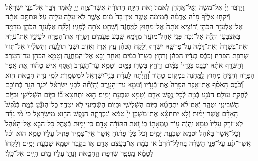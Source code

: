 \documentclass[twoside, openany, parskip=half, 11pt]{book}
\begin{document}
\begin{footnotesize}
\begin{multicols}{2}
\\
וַיְֿדַבֵּ֣ר יְיָ֔ אֶל־מֹשֶׁ֥ה וְֿאֶֽל־אַֽהֲרֹ֖ן לֵאמֹֽר׃ זֹ֚את חֻקַּ֣ת הַתּוֹרָ֔ה אֲשֶׁר־צִוָּ֥ה יְיָ֖ לֵאמֹ֑ר דַּבֵּ֣ר אֶל־בְּֿנֵ֣י יִשְׂרָאֵ֗ל וְֿיִקְח֣וּ אֵלֶ֩יךָ֩ פָרָ֨ה אֲדֻמָּ֜ה תְּֿמִימָ֗ה אֲשֶׁ֤ר אֵין־בָּהּ֙ מ֔וּם אֲשֶׁ֛ר לֹֽא־עָלָ֥ה עָלֶ֖יהָ עֹֽל׃ וּנְתַתֶּ֣ם אֹתָ֔הּ אֶל־אֶלְעָזָ֖ר הַכֹּהֵ֑ן וְֿהוֹצִ֤יא אֹתָהּ֙ אֶל־מִח֣וּץ לַֽמַּֽחֲנֶ֔ה וְֿשָׁחַ֥ט אֹתָ֖הּ לְֿפָנָֽיו׃ וְֿלָקַ֞ח אֶלְעָזָ֧ר הַכֹּהֵ֛ן מִדָּמָ֖הּ בְּֿאֶצְבָּע֑וֹ וְֿהִזָּ֞ה אֶל־נֹ֨כַח פְּֿנֵ֧י אֹֽהֶל־מוֹעֵ֛ד מִדָּמָ֖הּ שֶׁ֥בַע פְּֿעָמִֽים׃ וְֿשָׂרַ֥ף אֶת־הַפָּרָ֖ה לְֿעֵינָ֑יו אֶת־עֹרָ֤הּ וְֿאֶת־בְּֿשָׂרָהּ֙ וְֿאֶת־דָּמָ֔הּ עַל־פִּרְשָׁ֖הּ יִשְׂרֹֽף׃ וְֿלָקַ֣ח הַכֹּהֵ֗ן עֵ֥ץ אֶ֛רֶז וְֿאֵז֖וֹב וּשְׁנִ֣י תוֹלָ֑עַת וְֿהִשְׁלִ֕יךְ אֶל־תּ֖וֹךְ שְֿׂרֵפַ֥ת הַפָּרָֽה׃  וְֿכִבֶּ֨ס בְּֿגָדָ֜יו הַכֹּהֵ֗ן וְֿרָחַ֤ץ בְּֿשָׂרוֹ֙ בַּמַּ֔יִם וְֿאַחַ֖ר יָבֹ֣א אֶל־הַֽמַּֽחֲנֶ֑ה וְֿטָמֵ֥א הַכֹּהֵ֖ן עַד־הָעָֽרֶב׃ וְֿהַשֹּׂרֵ֣ף אֹתָ֔הּ יְֿכַבֵּ֤ס בְּֿגָדָיו֙ בַּמַּ֔יִם וְֿרָחַ֥ץ בְּֿשָׂר֖וֹ בַּמָּ֑יִם וְֿטָמֵ֖א עַד־הָעָֽרֶב׃ וְֿאָסַ֣ף אִ֣ישׁ טָה֗וֹר אֵ֚ת אֵ֣פֶר הַפָּרָ֔ה וְֿהִנִּ֛יחַ מִח֥וּץ לַֽמַּֽחֲנֶ֖ה בְּֿמָק֣וֹם טָה֑וֹר וְֽֿ֠הָֽיְֿתָ֠ה לַֽעֲדַ֨ת בְּֿנֵֽי־יִשְׂרָאֵ֧ל לְֿמִשְׁמֶ֛רֶת לְֿמֵ֥י נִדָּ֖ה חַטָּ֥את הִֽוא׃
וְֿ֠כִבֶּ֠ס הָֽאֹסֵ֨ף אֶת־אֵ֤פֶר הַפָּרָה֙ אֶת־בְּֿגָדָ֔יו וְֿטָמֵ֖א עַד־הָעָ֑רֶב וְֽֿהָֽיְֿתָ֞ה לִבְנֵ֣י יִשְׂרָאֵ֗ל וְֿלַגֵּ֛ר הַגָּ֥ר בְּֿתוֹכָ֖ם לְֿחֻקַּ֥ת עוֹלָֽם׃
הַנֹּגֵ֥עַ בְּֿמֵ֖ת לְֿכׇל־נֶ֣פֶשׁ אָדָ֑ם וְֿטָמֵ֖א שִׁבְעַ֥ת יָמִֽים׃ ה֣וּא יִתְחַטָּא־ב֞וֹ בַּיּ֧וֹם הַשְּֿׁלִישִׁ֛י וּבַיּ֥וֹם הַשְּֿׁבִיעִ֖י יִטְהָ֑ר וְֿאִם־לֹ֨א יִתְחַטָּ֜א בַּיּ֧וֹם הַשְּֿׁלִישִׁ֛י וּבַיּ֥וֹם הַשְּֿׁבִיעִ֖י לֹ֥א יִטְהָֽר׃ כׇּל־הַנֹּגֵ֡עַ בְּֿמֵ֣ת בְּֿנֶ֩פֶשׁ֩ הָֽאָדָ֨ם אֲשֶׁר־יָמ֜וּת וְֿלֹ֣א יִתְחַטָּ֗א אֶת־מִשְׁכַּ֤ן יְיָ֙ טִמֵּ֔א וְֿנִכְרְתָ֛ה הַנֶּ֥פֶשׁ הַהִ֖וא מִיִּשְׂרָאֵ֑ל כִּי֩ מֵ֨י נִדָּ֜ה לֹֽא־זֹרַ֤ק עָלָיו֙ טָמֵ֣א יִֽהְיֶ֔ה ע֖וֹד טֻמְאָת֥וֹ בֽוֹ׃ זֹ֚את הַתּוֹרָ֔ה אָדָ֖ם כִּֽי־יָמ֣וּת בְּֿאֹ֑הֶל כׇּל־הַבָּ֤א אֶל־הָאֹ֨הֶל֙ וְֿכׇל־אֲשֶׁ֣ר בָּאֹ֔הֶל יִטְמָ֖א שִׁבְעַ֥ת יָמִֽים׃ וְֿכֹל֙ כְּֿלִ֣י פָת֔וּחַ אֲשֶׁ֛ר אֵין־צָמִ֥יד פָּתִ֖יל עָלָ֑יו טָמֵ֖א הֽוּא׃ וְֿכֹ֨ל אֲשֶׁר־יִגַּ֜ע עַל־פְּֿנֵ֣י הַשָּׂדֶ֗ה בַּֽחֲלַל־חֶ֨רֶב֙ א֣וֹ בְֿמֵ֔ת אֽוֹ־בְֿעֶ֥צֶם אָדָ֖ם א֣וֹ בְֿקָ֑בֶר יִטְמָ֖א שִׁבְעַ֥ת יָמִֽים׃ וְֿלָֽקְֿחוּ֙ לַטָּמֵ֔א מֵֽעֲפַ֖ר שְֿׂרֵפַ֣ת הַֽחַטָּ֑את וְֿנָתַ֥ן עָלָ֛יו מַ֥יִם חַיִּ֖ים אֶל־כֶּֽלִי׃


\end{multicols}
\end{footnotesize}
\end{document}
